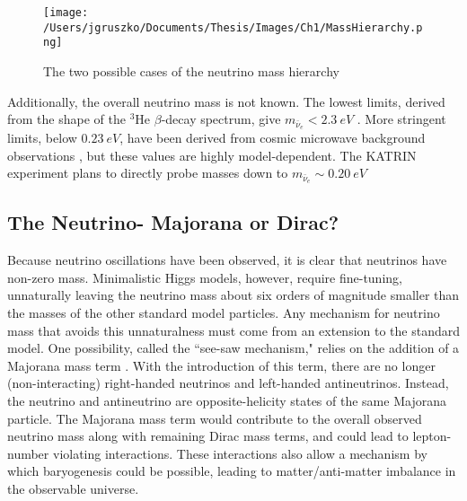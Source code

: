 \begin{figure}[]
\hfil \texttt{[image: /Users/jgruszko/Documents/Thesis/Images/Ch1/MassHierarchy.png]} \hfil
\caption{The two possible cases of the neutrino mass hierarchy \cite{Hewett2012}}
\label{mass_hierarchy}
\end{figure}

Additionally, the overall neutrino mass is not known. The lowest limits, derived from the shape of the $^{3}$He $\beta$-decay spectrum, give $m_{\bar{\nu}_{e}} < 2.3~eV$ \cite{Eitel2005}. More stringent limits, below $0.23~eV$, have been derived from cosmic microwave background observations \cite{PlanckXVI_2013}, but these values are highly model-dependent. The KATRIN experiment plans to directly probe masses down to $m_{\bar{\nu}_{e}} \sim 0.20~eV$ \cite{KATRIN2015}

\subsection{The Neutrino- Majorana or Dirac?}
Because neutrino oscillations have been observed, it is clear that neutrinos have non-zero mass. Minimalistic Higgs models, however, require fine-tuning, unnaturally leaving the neutrino mass about six orders of magnitude smaller than the masses of the other standard model particles. Any mechanism for neutrino mass that avoids this unnaturalness must come from an extension to the standard model. One possibility, called the ``see-saw mechanism," relies on the addition of a Majorana mass term \cite{Supergravity1979}. With the introduction of this term, there are no longer (non-interacting) right-handed neutrinos and left-handed antineutrinos. Instead, the neutrino and antineutrino are opposite-helicity states of the same Majorana particle. The Majorana mass term would contribute to the overall observed neutrino mass along with remaining Dirac mass terms, and could lead to lepton-number violating interactions. These interactions also allow a mechanism by which baryogenesis could be possible, leading to matter/anti-matter imbalance in the observable universe. \cite{DiBari2012}  


